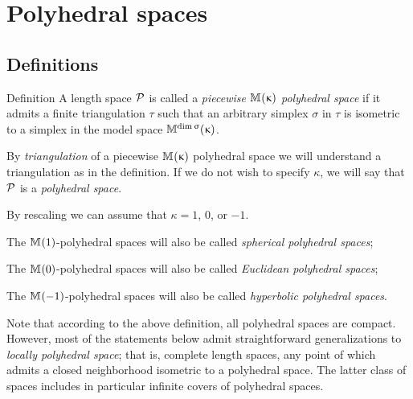 \chapter{Polyhedral spaces}

\section{Definitions}

\begin{thm}{Definition}\label{def:poly}
A length space $\mathcal{P}$ is called a
\emph{piecewise $\mathbb{M}_{{}}^{}({\upkappa})$ polyhedral space} 
if it admits a finite triangulation $\tau$ 
such that an arbitrary simplex $\sigma$ in $\tau$ is isometric to a simplex in the model space $\mathbb{M}_{{}}^{\mathop{\rm dim}\nolimits \upsigma}({\upkappa})$.

By \emph{triangulation} of a piecewise
$\mathbb{M}_{{}}^{}({\upkappa})$ polyhedral space 
we will understand a triangulation as in the definition.
If we do not wish to specify $\kappa$, we will say that $\mathcal{P}$ is a \emph{polyhedral space}. 

By rescaling we can assume that $\kappa=1$, $0$, or $-1$.
\begin{subthm}{}
The $\mathbb{M}_{{}}^{}({1})$-polyhedral spaces will also be 
called 
\emph{spherical polyhedral spaces};
\end{subthm}

\begin{subthm}{}
The $\mathbb{M}_{{}}^{}({0})$-polyhedral spaces will also be 
called 
\emph{Euclidean polyhedral spaces};
\end{subthm}

\begin{subthm}{}
The $\mathbb{M}_{{}}^{}({-1})$-polyhedral spaces will also be 
called 
\emph{hyperbolic polyhedral spaces}.
\end{subthm}
\end{thm}

Note that according to the above definition,
all polyhedral spaces are compact.
However, 
most of the statements below admit straightforward generalizations 
to \emph{locally polyhedral space};
that is, complete length spaces,  
any point of which admits a closed neighborhood isometric to a polyhedral space.
The latter class of spaces includes in particular  infinite covers of polyhedral spaces.

